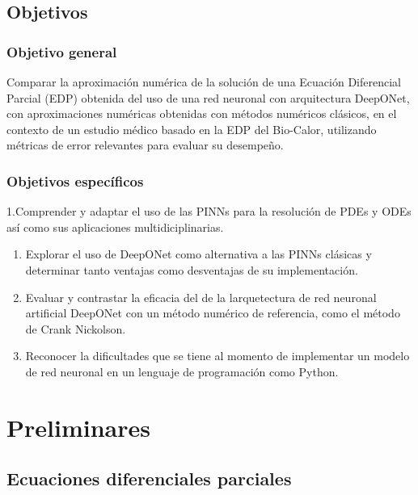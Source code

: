 \documentclass[
  spanish,
  us-letterpaper,
  DIV=11,
  numbers=noendperiod]{scrreprt}
\theoremstyle{plain}
\theoremstyle{definition}
\theoremstyle{remark}
\begin{document}

\chapter{Objetivos}\label{objetivos}

\section{Objetivo general}\label{objetivo-general}

Comparar la aproximación numérica de la solución de una Ecuación
Diferencial Parcial (EDP) obtenida del uso de una red neuronal con
arquitectura DeepONet, con aproximaciones numéricas obtenidas con
métodos numéricos clásicos, en el contexto de un estudio médico basado
en la EDP del Bio-Calor, utilizando métricas de error relevantes para
evaluar su desempeño.

\section{Objetivos específicos}\label{objetivos-especuxedficos}

1.Comprender y adaptar el uso de las PINNs para la resolución de PDEs y
ODEs así como sus aplicaciones multidiciplinarias.

\begin{enumerate}
\def\labelenumi{\arabic{enumi}.}
\setcounter{enumi}{1}
\item
  Explorar el uso de DeepONet como alternativa a las PINNs clásicas y
  determinar tanto ventajas como desventajas de su implementación.
\item
  Evaluar y contrastar la eficacia del de la larquetectura de red
  neuronal artificial DeepONet con un método numérico de referencia,
  como el método de Crank Nickolson.
\item
  Reconocer la dificultades que se tiene al momento de implementar un
  modelo de red neuronal en un lenguaje de programación como Python.
\end{enumerate}

\part{Preliminares}

\chapter{Ecuaciones diferenciales
parciales}\label{ecuaciones-diferenciales-parciales}
\end{document}
